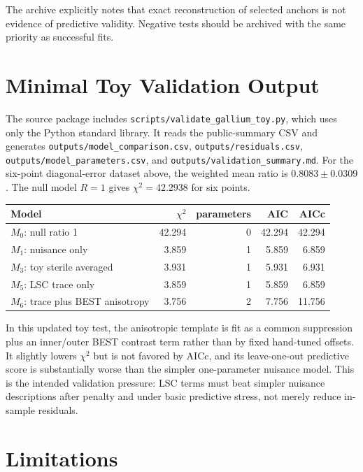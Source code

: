 \documentclass[11pt]{article}
\begin{document}
The archive explicitly notes that exact reconstruction of selected anchors is
not evidence of predictive validity.  Negative tests should be archived with the
same priority as successful fits.

\section{Minimal Toy Validation Output}

The source package includes \texttt{scripts/validate\_gallium\_toy.py}, which
uses only the Python standard library.  It reads the public-summary CSV and
generates \texttt{outputs/model\_comparison.csv},
\texttt{outputs/residuals.csv}, \texttt{outputs/model\_parameters.csv}, and
\texttt{outputs/validation\_summary.md}.
For the six-point diagonal-error dataset above, the weighted mean ratio is
$0.8083\pm0.0309$.  The null model $R=1$ gives $\chi^2=42.2938$ for six points.

\begin{center}
\begin{tabular}{lrrrr}
\toprule
Model & $\chi^2$ & parameters & AIC & AICc \\
\midrule
$M_0$: null ratio 1 & 42.294 & 0 & 42.294 & 42.294 \\
$M_1$: nuisance only & 3.859 & 1 & 5.859 & 6.859 \\
$M_3$: toy sterile averaged & 3.931 & 1 & 5.931 & 6.931 \\
$M_5$: LSC trace only & 3.859 & 1 & 5.859 & 6.859 \\
$M_6$: trace plus BEST anisotropy & 3.756 & 2 & 7.756 & 11.756 \\
\bottomrule
\end{tabular}
\end{center}

In this updated toy test, the anisotropic template is fit as a common
suppression plus an inner/outer BEST contrast term rather than by fixed
hand-tuned offsets.  It slightly lowers $\chi^2$ but is not favored by AICc,
and its leave-one-out predictive score is substantially worse than the simpler
one-parameter nuisance model.  This is the intended validation pressure: LSC
terms must beat simpler nuisance descriptions after penalty and under basic
predictive stress, not merely reduce in-sample residuals.

\section{Limitations}
\end{document}
